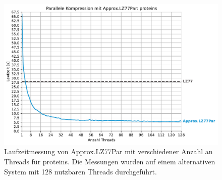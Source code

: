\begin{figure}[ht]
    \centering
    \caption{Laufzeitmessung von Approx.LZ77Par mit verschiedener Anzahl an Threads für proteins. Die Messungen wurden auf einem alternativen System mit 128 nutzbaren Threads durchgeführt.}
    \includegraphics[scale=0.7]{Images/progressive_speedup_alternative.pdf}
\end{figure}

